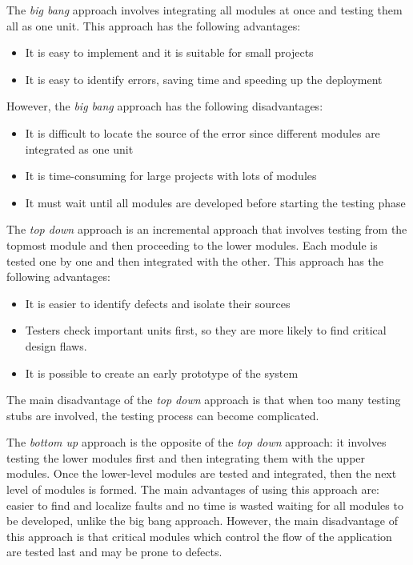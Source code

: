 The \emph{big bang} approach involves integrating all modules at once and testing them all as one unit.
This approach has the following advantages:

\begin{itemize}
	\item It is easy to implement and it is suitable for small projects
	\item It is easy to identify errors, saving time and speeding up the deployment
\end{itemize}

However, the \emph{big bang} approach has the following disadvantages:

\begin{itemize}
	\item It is difficult to locate the source of the error since different modules are integrated as one unit
	\item It is time-consuming for large projects with lots of modules
	\item It must wait until all modules are developed before starting the testing phase
\end{itemize}

The \emph{top down} approach is an incremental approach that involves testing from the topmost module and then proceeding to the lower modules.
Each module is tested one by one and then integrated with the other. This approach has the following advantages:

\begin{itemize}
	\item It is easier to identify defects and isolate their sources
	\item Testers check important units first, so they are more likely to find critical design flaws.
	\item It is possible to create an early prototype of the system
\end{itemize}

The main disadvantage of the \emph{top down} approach is that when too many testing stubs are involved, the testing process can become complicated.

The \emph{bottom up} approach is the opposite of the \emph{top down} approach: it involves testing the lower modules first and then integrating
them with the upper modules. Once the lower-level modules are tested and integrated, then the next level of modules is formed.
The main advantages of using this approach are: easier to find and localize faults and no time is wasted waiting for all modules to be developed,
unlike the big bang approach. However, the main disadvantage of this approach is that critical modules which control the flow of the application are
tested last and may be prone to defects.

